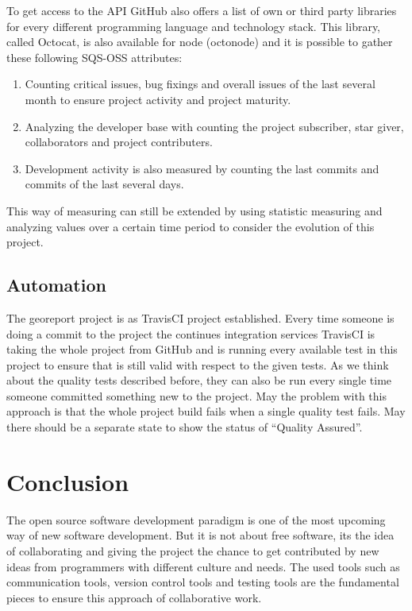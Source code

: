 \documentclass[DIV=calc,paper=a4,fontsize=9pt,twocolumn]{scrartcl}
\begin{document}
To get access to the API GitHub also offers a list of own or third party libraries for every different programming language and technology stack. This library, called Octocat, is also available for node (octonode) and it is possible to gather these following SQS-OSS attributes:

\begin{enumerate}
    \item Counting critical issues, bug fixings and overall issues of the last several month to ensure project activity and project maturity. 
    \item Analyzing the developer base with counting the project subscriber, star giver, collaborators and project contributers.
    \item Development activity is also measured by counting the last commits and commits of the last several days.
\end{enumerate}

This way of measuring can still be extended by using statistic measuring and analyzing values over a certain time period to consider the evolution of this project. 

\subsection{Automation}

The georeport project is as TravisCI project established. Every time someone is doing a commit to the project the continues integration services TravisCI is taking the whole project from GitHub and is running every available test in this project to ensure that is still valid with respect to the given tests. As we think about the quality tests described before, they can also be run every single time someone committed something new to the project. May the problem with this approach is that the whole project build fails when a single quality test fails. May there should be a separate state to show the status of \enquote{Quality Assured}.

\section{Conclusion}

The open source software development paradigm is one of the most upcoming way of new software development. But it is not about free software, its the idea of collaborating and giving the project the chance to get contributed by new ideas from programmers with different culture and needs. The used tools such as communication tools, version control tools and testing tools are the fundamental pieces to ensure this approach of collaborative work.
\end{document}
